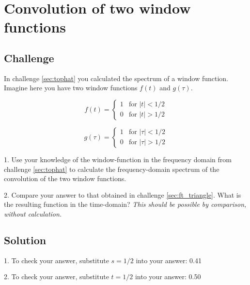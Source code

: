 \newpage
\section{Convolution of two window functions}

\subsection*{Challenge}

In challenge \ref{sec:tophat} you calculated the spectrum of a window function. Imagine here you have two window functions $f(t)$ and $g(\tau)$.

\begin{equation}
    f(t)=
    \begin{cases}
        1 & \text{for } |t| < 1/2 \\
        0 & \text{for } |t| > 1/2
    \end{cases}
\end{equation}

\begin{equation}
    g(\tau)=
    \begin{cases}
        1 & \text{for } |\tau| < 1/2 \\
        0 & \text{for } |\tau| > 1/2
    \end{cases}
\end{equation}

1. Use your knowledge of the window-function in the frequency domain from challenge \ref{sec:tophat} to calculate the frequency-domain spectrum of the convolution of the two window functions.

2. Compare your answer to that obtained in challenge \ref{sec:ft_triangle}. What is the resulting function in the time-domain? \emph{This should be possible by comparison, without calculation.}

\subsection*{Solution}
1. To check your answer, substitute $s=1/2$ into your answer: 0.41

2. To check your answer, substitute $t=1/2$ into your answer: 0.50

